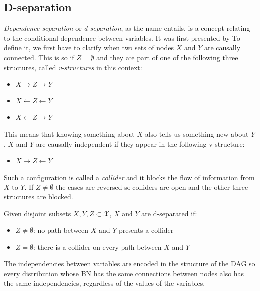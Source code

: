 \subsection{D-separation} \label{subsec:d-separation}
\textit{Dependence-separation} or \textit{d-separation}, as the name entails, is a concept relating to the conditional dependence between variables.
It was first presented by \cite{Pearl1988}
To define it, we first have to clarify when two sets of nodes $X$ and $Y$ are causally connected.
This is so if $Z = \emptyset$ and they are part of one of the following three structures, called \textit{v-structures} in this context:
\begin{itemize}
  \item $X \rightarrow Z \rightarrow Y$
  \item $X \leftarrow Z \leftarrow Y$
  \item $X \leftarrow Z \rightarrow Y$
\end{itemize}
This means that knowing something about $X$ also tells us something new about $Y$.
$X$ and $Y$ are causally independent if they appear in the following v-structure:
\begin{itemize}
  \item $X \rightarrow Z \leftarrow  Y$
\end{itemize}
Such a configuration is called a \textit{collider} and it blocks the flow of information from $X$ to $Y$.
If $Z \neq \emptyset$ the cases are reversed so colliders are open and the other three structures are blocked.
\begin{definition}
	Given disjoint subsets $X, Y, Z \subset \mathcal{X}$, $X$ and $Y$ are d-separated if:
	\begin{itemize}
		\item $Z \neq \emptyset$: no path between $X$ and $Y$ presents a collider
		\item $Z = \emptyset$: there is a collider on every path between $X$ and $Y$
	\end{itemize}
\end{definition}

The independencies between variables are encoded in the structure of the DAG so every distribution whose BN has the same connections between nodes also has the same independencies, regardless of the values of the variables.

